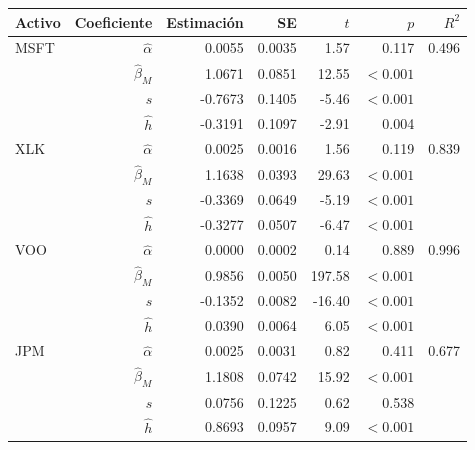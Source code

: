 \begin{tabular}{lrrrrrr}
\hline
Activo & Coeficiente & Estimación & SE & $t$ & $p$ & $R^2$ \\
\hline
MSFT & $\hat\alpha$ & 0.0055 & 0.0035 & 1.57 & 0.117 & 0.496 \\
 & $\hat\beta_M$ & 1.0671 & 0.0851 & 12.55 & $<0.001$ &  \\
 & $\hat s$ & -0.7673 & 0.1405 & -5.46 & $<0.001$ &  \\
 & $\hat h$ & -0.3191 & 0.1097 & -2.91 & 0.004 &  \\
XLK & $\hat\alpha$ & 0.0025 & 0.0016 & 1.56 & 0.119 & 0.839 \\
 & $\hat\beta_M$ & 1.1638 & 0.0393 & 29.63 & $<0.001$ &  \\
 & $\hat s$ & -0.3369 & 0.0649 & -5.19 & $<0.001$ &  \\
 & $\hat h$ & -0.3277 & 0.0507 & -6.47 & $<0.001$ &  \\
VOO & $\hat\alpha$ & 0.0000 & 0.0002 & 0.14 & 0.889 & 0.996 \\
 & $\hat\beta_M$ & 0.9856 & 0.0050 & 197.58 & $<0.001$ &  \\
 & $\hat s$ & -0.1352 & 0.0082 & -16.40 & $<0.001$ &  \\
 & $\hat h$ & 0.0390 & 0.0064 & 6.05 & $<0.001$ &  \\
JPM & $\hat\alpha$ & 0.0025 & 0.0031 & 0.82 & 0.411 & 0.677 \\
 & $\hat\beta_M$ & 1.1808 & 0.0742 & 15.92 & $<0.001$ &  \\
 & $\hat s$ & 0.0756 & 0.1225 & 0.62 & 0.538 &  \\
 & $\hat h$ & 0.8693 & 0.0957 & 9.09 & $<0.001$ &  \\
\hline
\end{tabular}
